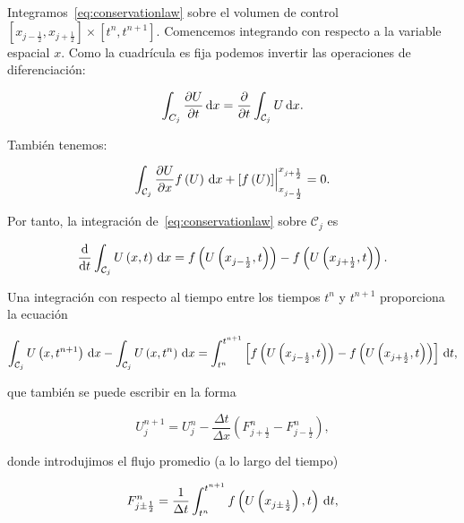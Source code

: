 Integramos~\eqref{eq:conservationlaw} sobre el volumen de control
\begin{math}
	\left[
		x_{j-\frac{1}{2}},
		x_{j+\frac{1}{2}}
		\right]\times
	\left[
		t^{n},
		t^{n+1}
		\right]
\end{math}.
Comencemos integrando con respecto a la variable espacial $x$.
Como la cuadrícula es fija podemos invertir las operaciones de
diferenciación:

\begin{equation*}
	\int_{C_{j}}
	\diffp{U}{t}
	\dl x=
	\diffp{}{t}
	\int_{\mathcal{C}_{j}}
	U\dl x.
\end{equation*}

También tenemos:

\begin{equation*}
	\int_{\mathcal{C}_{j}}
	\diffp{U}{x}
	f\left(U\right)
	\dl x+
	{
	\left[
		f\left(U\right)
		\right]
	\Bigr|
	}_{x_{j-\frac{1}{2}}}^{x_{j+\frac{1}{2}}}
	=0.
\end{equation*}

Por tanto, la integración de~\eqref{eq:conservationlaw} sobre
$\mathcal{C}_{j}$ es

\begin{equation*}
	\diff{}{t}
	\int_{\mathcal{C}_{j}}
	U\left(x,t\right)
	\dl x=
	f\left(U\left(x_{j-\frac{1}{2}},t\right)\right)-
	f\left(U\left(x_{j+\frac{1}{2}},t\right)\right).
\end{equation*}

Una integración con respecto al tiempo entre los tiempos $t^{n}$ y
$t^{n+1}$ proporciona la ecuación

\begin{equation*}
	\int_{\mathcal{C}_{j}}
	U
	\left(x,t^{n+1}\right)
	\dl x-
	\int_{\mathcal{C}_{j}}
	U
	\left(x,t^{n}\right)
	\dl x=
	\int_{t^{n}}^{t^{n+1}}
	\left[
		f\left(U\left(x_{j-\frac{1}{2}},t\right)\right)-
		f\left(U\left(x_{j+\frac{1}{2}},t\right)\right)
		\right]\dl t,
\end{equation*}

que también se puede escribir en la forma

\begin{equation*}
	\boxed{
		U^{n+1}_{j}=
		U^{n}_{j}-
		\frac{\Delta t}{\Delta x}
		\left(
		F^{n}_{j+\frac{1}{2}}-
		F^{n}_{j-\frac{1}{2}}
		\right),
	}
\end{equation*}

donde introdujimos el flujo promedio (a lo largo del tiempo)

\begin{equation*}
	F^{n}_{j\pm\frac{1}{2}}=
	\frac{1}{\Delta t}
	\int_{t^{n}}^{t^{n+1}}
	f\left(U\left(x_{j\pm\frac{1}{2}}\right),t\right)
	\dl t,
\end{equation*}

